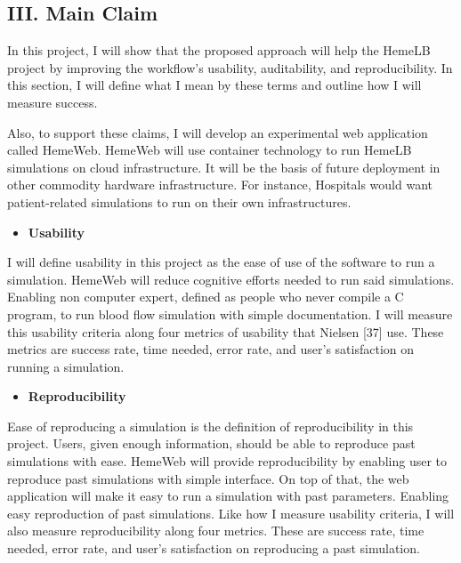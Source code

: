 \documentclass[]{article}
\providecommand{\tightlist}{%
  \setlength{\itemsep}{0pt}\setlength{\parskip}{0pt}}
\begin{document}
\subsection{III. Main Claim}\label{iii.-main-claim}

In this project, I will show that the proposed approach will help the
HemeLB project by improving the workflow's usability, auditability, and
reproducibility. In this section, I will define what I mean by these
terms and outline how I will measure success.

Also, to support these claims, I will develop an experimental web
application called HemeWeb. HemeWeb will use container technology to run
HemeLB simulations on cloud infrastructure. It will be the basis of
future deployment in other commodity hardware infrastructure. For
instance, Hospitals would want patient-related simulations to run on
their own infrastructures.

\begin{itemize}
\tightlist
\item
  \textbf{Usability}
\end{itemize}

I will define usability in this project as the ease of use of the
software to run a simulation. HemeWeb will reduce cognitive efforts
needed to run said simulations. Enabling non computer expert, defined as
people who never compile a C program, to run blood flow simulation with
simple documentation. I will measure this usability criteria along four
metrics of usability that Nielsen {[}37{]} use. These metrics are
success rate, time needed, error rate, and user's satisfaction on
running a simulation.

\begin{itemize}
\tightlist
\item
  \textbf{Reproducibility}
\end{itemize}

Ease of reproducing a simulation is the definition of reproducibility in
this project. Users, given enough information, should be able to
reproduce past simulations with ease. HemeWeb will provide
reproducibility by enabling user to reproduce past simulations with
simple interface. On top of that, the web application will make it easy
to run a simulation with past parameters. Enabling easy reproduction of
past simulations. Like how I measure usability criteria, I will also
measure reproducibility along four metrics. These are success rate, time
needed, error rate, and user's satisfaction on reproducing a past
simulation.
\end{document}
